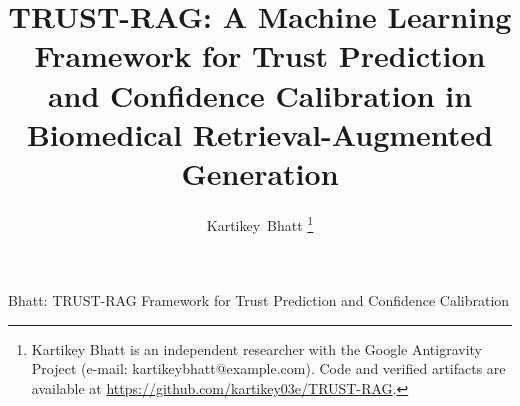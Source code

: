 \documentclass[journal,10pt]{IEEEtran}
\begin{document}
\title{TRUST-RAG: A Machine Learning Framework for Trust Prediction and Confidence Calibration in Biomedical Retrieval-Augmented Generation}

\author{Kartikey~Bhatt%
\thanks{Kartikey Bhatt is an independent researcher with the Google Antigravity Project (e-mail: kartikeybhatt@example.com). Code and verified artifacts are available at \url{https://github.com/kartikey03e/TRUST-RAG}.}%
}

%
{Bhatt: TRUST-RAG Framework for Trust Prediction and Confidence Calibration}

\maketitle
\end{document}
